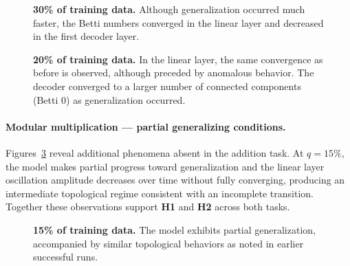 \begin{figure}
    \centering
    
    
    \caption[30\% of training data (Modular Product).]{\textbf{30\% of training data.} Although generalization occurred much faster, the Betti numbers converged in the linear layer and decreased in the first decoder layer.}
    \label{fig:prod-decoder0-linear-30pct}
\end{figure}

\begin{figure}
    \centering
    
    
    \caption[20\% of training data (Modular Product).]{\textbf{20\% of training data.} In the linear layer, the same convergence as before is observed, although preceded by anomalous behavior. The decoder converged to a larger number of connected components (Betti 0) as generalization occurred.}
    \label{fig:prod-decoder0-linear-20pct}
\end{figure}

\paragraph{Modular multiplication — partial generalizing conditions.}
Figures~\ref{fig:prod-decoder0-linear-15pct}  reveal additional phenomena absent in the addition task. At $q = 15\%$, the model makes partial progress toward generalization and the linear layer oscillation amplitude decreases over time without fully converging, producing an intermediate topological regime consistent with an incomplete transition. Together these observations support \textbf{H1} and \textbf{H2} across both tasks.

\begin{figure}[htbp]
    \centering
    
    
    \caption[15\% of training data (Modular Product).]{\textbf{15\% of training data.} The model exhibits partial generalization, accompanied by similar topological behaviors as noted in earlier successful runs.}
    \label{fig:prod-decoder0-linear-15pct}
\end{figure}



